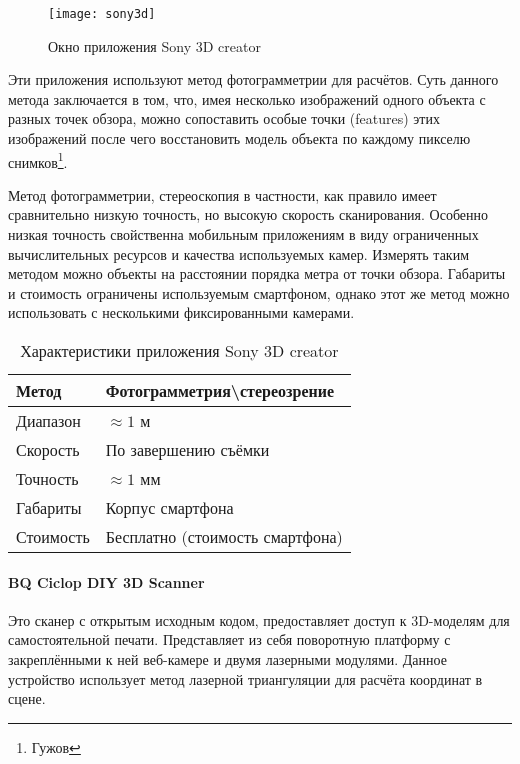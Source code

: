        \begin{figure}[H]
            \centering
            \texttt{[image: sony3d]}\label{pic:sony3d}
            \caption{Окно приложения Sony 3D creator}
        \end{figure}

        Эти приложения используют метод фотограмметрии для расчётов. Суть данного метода заключается в том, что, имея несколько изображений одного объекта с разных точек обзора, можно сопоставить особые точки (features) этих изображений после чего восстановить модель объекта по каждому пикселю снимков\footnote{Гужов}.

        Метод фотограмметрии, стереоскопия в частности, как правило имеет сравнительно низкую точность, но высокую скорость сканирования. Особенно низкая точность свойственна мобильным приложениям в виду ограниченных вычислительных ресурсов и качества используемых камер. Измерять таким методом можно объекты на расстоянии порядка метра от точки обзора. Габариты и стоимость ограничены используемым смартфоном, однако этот же метод можно использовать с несколькими фиксированными камерами.

        \begin{table}[H]
            \centering
            \caption{Характеристики приложения Sony 3D creator}\label{table:sony3d}
            \begin{tabular}{|l|l|}\hline
                Метод&Фотограмметрия\textbackslash{}стереозрение\\ \hline
                Диапазон&$\approx 1$ м\\ \hline
                Скорость&По завершению съёмки\\ \hline
                Точность&$\approx 1$ мм\\ \hline
                Габариты&Корпус смартфона\\ \hline
                Стоимость&Бесплатно (стоимость смартфона)\\ \hline
            \end{tabular}
        \end{table}

    \paragraph{BQ Ciclop DIY 3D Scanner}
        Это сканер с открытым исходным кодом, предоставляет доступ к 3D-моделям для самостоятельной печати. Представляет из себя поворотную платформу с закреплёнными к ней веб-камере и двумя лазерными модулями. Данное устройство использует метод лазерной триангуляции для расчёта координат в сцене.

